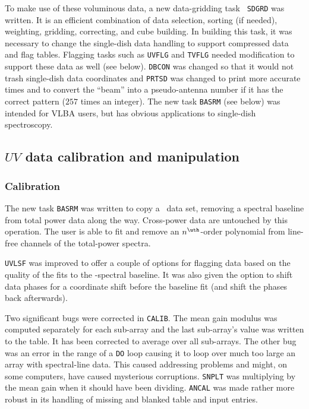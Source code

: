 To make use of these voluminous data, a new data-gridding task {\tt
SDGRD} was written.  It is an efficient combination of data selection,
sorting (if needed), weighting, gridding, correcting, and cube
building.  In building this task, it was necessary to change the
single-dish data handling to support compressed data and flag tables.
Flagging tasks such as {\tt UVFLG} and {\tt TVFLG} needed modification
to support these data as well (see below).  {\tt DBCON} was changed so
that it would not trash single-dish data coordinates and {\tt PRTSD}
was changed to print more accurate times and to convert the ``beam''
into a pseudo-antenna number if it has the correct pattern ($257$
times an integer).  The new task {\tt BASRM} (see below) was intended
for VLBA users, but has obvious applications to single-dish
spectroscopy.

\subsection{$UV$ data calibration and manipulation}

\subsubsection{Calibration}

The new task {\tt BASRM} was written to copy a \uv\ data set, removing
a spectral baseline from total power data along the way.  Cross-power
data are untouched by this operation.  The user is able to fit and
remove an $n^{\uth}$-order polynomial from line-free channels of the
total-power spectra.

{\tt UVLSF} was improved to offer a couple of options for flagging
data based on the quality of the fits to the \uv-spectral baseline.
It was also given the option to shift data phases for a coordinate
shift before the baseline fit (and shift the phases back afterwards).

Two significant bugs were corrected in \hbox{{\tt CALIB}}.  The mean
gain modulus was computed separately for each sub-array and the last
sub-array's value was written to the table.  It has been corrected to
average over all sub-arrays.  The other bug was an error in the range
of a {\tt DO} loop causing it to loop over much too large an array
with spectral-line data.  This caused addressing problems and might,
on some computers, have caused mysterious corruptions.  {\tt SNPLT}
was multiplying by the mean gain when it should have been dividing.
{\tt ANCAL} was made rather more robust in its handling of missing and
blanked table and input entries.

